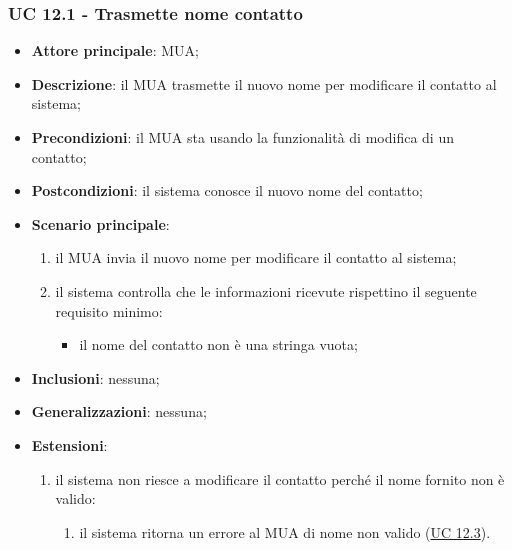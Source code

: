 \subsubsection{UC 12.1 - Trasmette nome contatto} \label{sec:UC12.1}
    \begin{itemize}
        \item \textbf{Attore principale}: MUA;
        \item \textbf{Descrizione}: il MUA trasmette il nuovo nome per modificare il contatto al sistema;
        \item \textbf{Precondizioni}: il MUA sta usando la funzionalità di modifica di un contatto;
        \item \textbf{Postcondizioni}: il sistema conosce il nuovo nome del contatto;
        \item \textbf{Scenario principale}:
            \begin{enumerate}
                \item il MUA invia il nuovo nome per modificare il contatto al sistema;
                \item il sistema controlla che le informazioni ricevute rispettino il seguente requisito minimo:
                    \begin{itemize}
                        \item il nome del contatto non è una stringa vuota;
                    \end{itemize}
            \end{enumerate}
        \item \textbf{Inclusioni}: nessuna;
        \item \textbf{Generalizzazioni}: nessuna;
        \item \textbf{Estensioni}:
            \begin{enumerate}[label=\alph*.]
                \item il sistema non riesce a modificare il contatto perché il nome fornito non è valido:
                \begin{enumerate}[label=\arabic*.]
                    \item il sistema ritorna un errore al MUA di nome non valido (\hyperref[sec:UC12.3]{UC 12.3}).
                \end{enumerate}
            \end{enumerate}
    \end{itemize}


